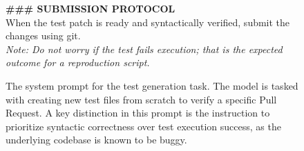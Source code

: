 \documentclass[11pt]{article}
\begin{document}
\begin{figure}[t!]
\begin{tcolorbox}
    \vspace{10pt}
     \textbf{\#\#\# SUBMISSION PROTOCOL} \\
    When the test patch is ready and syntactically verified, submit the changes using git. \\
    \textit{Note: Do not worry if the test fails execution; that is the expected outcome for a reproduction script.}

    \end{tcolorbox}
    \caption{The system prompt for the test generation task. The model is tasked with creating new test files from scratch to verify a specific Pull Request. A key distinction in this prompt is the instruction to prioritize syntactic correctness over test execution success, as the underlying codebase is known to be buggy.}
    \label{fig:testgen_prompt}
\end{figure}
\end{document}
